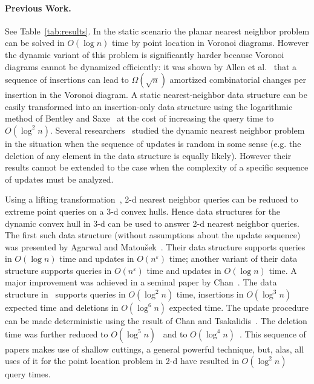\documentclass[12pt,a4paper,USenglish,cleveref, autoref, thm-restate]{article}
\newcommand{\eps}{\varepsilon}
\newcommand{\john}[1]{\textcolor{red}{#1}}
\newcommand{\eps}{\varepsilon}
\newcommand{\john}[1]{\textcolor{red}{#1}}
\newcommand{\eps}{\varepsilon}
\newcommand{\john}[1]{\textcolor{red}{#1}}
\begin{document}
\paragraph*{Previous Work.}
See Table~\ref{tab:results}.
In the static scenario the planar nearest neighbor  problem can be solved in $O(\log n)$ time by point location in  Voronoi diagrams.  However the dynamic variant of this problem is significantly harder because Voronoi diagrams cannot be dynamized efficiently:  it was shown by Allen et al.\ \cite{AllenBIL17} that a sequence of insertions can lead to $\Omega(\sqrt{n})$ amortized combinatorial changes per insertion in the Voronoi diagram. A static nearest-neighbor data structure can be easily transformed into an insertion-only data structure using the logarithmic method of Bentley and Saxe~\cite{BentleyS80} at the cost of increasing the query time to $O(\log^2 n)$. Several researchers~\cite{DevillersMT92,ClarksonMS93,Mulmuley94book} studied the dynamic nearest neighbor problem in the situation when the sequence of updates is random in some sense (e.g. the deletion of any element in the data structure is equally likely). However their results cannot be extended to the case when the complexity of a specific sequence of updates must be analyzed.


Using a lifting transformation~\cite{BergCKO08}, 2-d nearest neighbor queries can be reduced to extreme point queries on a 3-d convex hulls. Hence data structures for the dynamic convex hull in 3-d can be used to answer 2-d nearest neighbor queries. The first such  data structure (without assumptions about the update sequence) was presented by Agarwal and Matou\v{s}ek~\cite{AgarwalM95}. Their data structure supports queries in $O(\log n)$ time and updates in $O(n^{\eps})$ time; another variant of their data structure supports queries in $O(n^{\eps})$ time and updates in $O(\log n)$ time. A major improvement was achieved in a seminal paper by Chan~\cite{Chan10}. The data structure in~\cite{Chan10} supports queries in $O(\log^2 n)$ time, insertions in $O(\log^3 n)$ expected time and deletions in $O(\log^6n)$ expected time. The update procedure can be made deterministic using the result of Chan and Tsakalidis~\cite{ChanT16}.  The deletion time was further reduced to $O(\log^5n)$~\cite{KaplanMRSS20} and to  $O(\log^4 n)$~\cite{Chan20a}. %
This sequence of papers makes use of shallow cuttings, a general powerful technique, but, alas, all uses of it for the point location problem in 2-d have resulted in $O(\log^2 n)$ query times.
\end{document}
